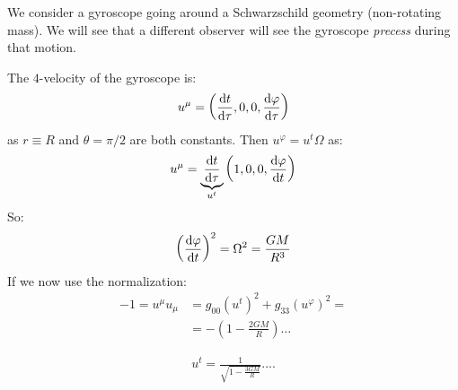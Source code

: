 \documentclass[../template.tex]{subfiles}
\begin{document}
\begin{example}
    We consider a gyroscope going around a Schwarzschild geometry (non-rotating mass). We will see that a different observer will see the gyroscope \textit{precess} during that motion.
    
    The $4$-velocity of the gyroscope is:
    \begin{align*}
        u^\mu = \left(\dv{t}{\tau}, 0, 0, \dv{\varphi}{\tau}\right)
    \end{align*} 
    as $r \equiv R$ and $\theta = \pi/2$ are both constants. Then $u^\varphi = u^t \Omega$ as:
    \begin{align*}
        u^\mu =\underbrace{ \dv{t}{\tau}}_{u^t}  \left(1,0,0,\dv{\varphi}{t}\right)
    \end{align*}   
    So:
    \begin{align*}
        \left(\dv{\varphi}{t}\right)^2 = \Omega^2 = \frac{GM}{R^3} 
    \end{align*}
    If we now use the normalization:
    \begin{align*}
        -1 = u^\mu u_\mu &= g_{00} (u^t)^2 + g_{33} (u^\varphi)^2 = \\
        &= -\left(1-\frac{2GM}{R} \right) \dots
    \end{align*}

    \begin{align*}
        u^t = \frac{1}{\sqrt{1-\frac{3GM}{R} }}  ....
    \end{align*}


\end{example}
\end{document}
